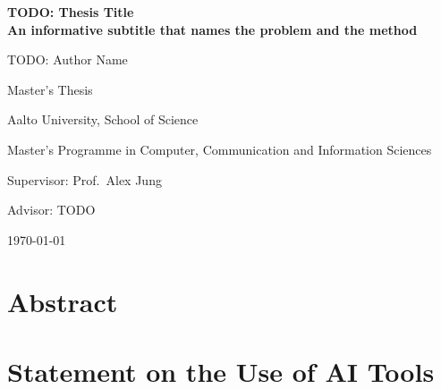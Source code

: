 \documentclass[11pt,a4paper,oneside]{report}
\begin{document}
\begin{titlepage}
\centering
\vspace*{2cm}
{\LARGE\bfseries TODO: Thesis Title \\[0.4em]
\large An informative subtitle that names the problem and the method\par}
\vspace{2cm}
{\Large TODO: Author Name\par}
\vspace{0.3cm}
{\large Master's Thesis\par}
{\large Aalto University, School of Science\par}
{\large Master's Programme in Computer, Communication and Information Sciences\par}
\vfill
{\large Supervisor: Prof.\ Alex Jung\par}
{\large Advisor: TODO\par}
\vspace{0.5cm}
{\large \today\par}
\end{titlepage}

\chapter*{Abstract}


\chapter*{Statement on the Use of AI Tools}
\end{document}
